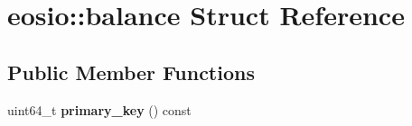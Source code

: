 \hypertarget{structeosio_1_1balance}{}\section{eosio\+:\+:balance Struct Reference}
\label{structeosio_1_1balance}
\subsection*{Public Member Functions}
\begin{DoxyCompactItemize}
\item 
\mbox{\label{structeosio_1_1balance_a61bf7990c26d6f28f6507e1fd2c56e44}} 
uint64\+\_\+t {\bfseries primary\+\_\+key} () const
\end{DoxyCompactItemize}
